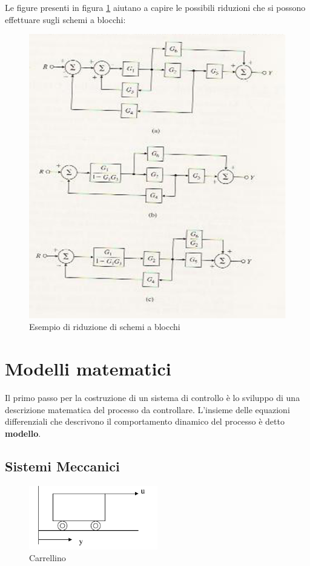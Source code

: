 \documentclass[a4paper]{report}
\begin{document}
Le figure presenti in figura \ref{fig:blockex} aiutano a capire le
possibili riduzioni che si possono effettuare sugli schemi a blocchi: 
\begin{figure}[!hbp]
  \begin{center}
    \includegraphics[scale=0.5]{./figures/block_example.png}
    \caption{Esempio di riduzione di schemi a blocchi}
    \label{fig:blockex}
  \end{center}
\end{figure} 

\chapter{Modelli matematici}
Il primo passo per la costruzione di un sistema di controllo \`e lo
sviluppo di una descrizione matematica del processo da
controllare. L'insieme delle equazioni differenziali che descrivono il
comportamento dinamico del processo \`e detto {\bf modello}.

\section{Sistemi Meccanici}
\begin{figure}[!b]
\centering
\includegraphics[width=0.5\textwidth]{./images/carrello.png}
\caption{Carrellino\label{fig:carrello}}
\end{figure}
\end{document}
